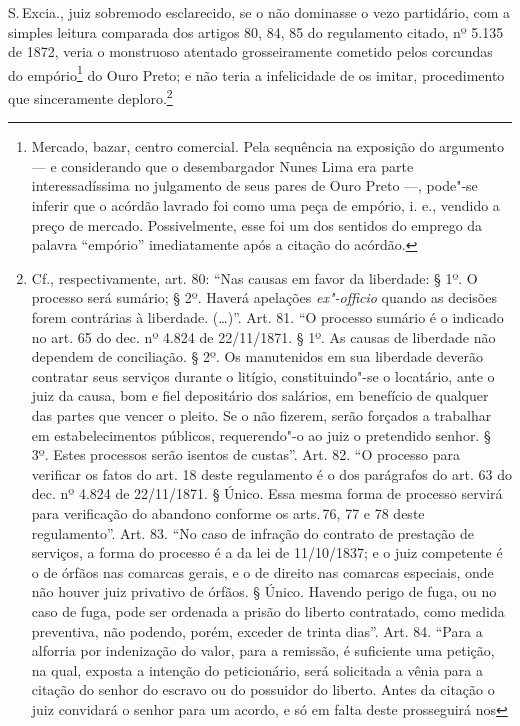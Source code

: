 S.\,Excia., juiz sobremodo esclarecido, se o não dominasse o vezo
partidário, com a simples leitura comparada dos artigos 80, 84, 85 do
regulamento citado, nº 5.135 de 1872, veria o monstruoso atentado
grosseiramente cometido pelos corcundas do empório\footnote{Mercado,
  bazar, centro comercial. Pela sequência na exposição do argumento --- e
  considerando que o desembargador Nunes Lima era parte interessadíssima no
  julgamento de seus pares de Ouro Preto ---, pode"-se inferir que o
  acórdão lavrado foi como uma peça de empório, i. e., vendido a preço
  de mercado. Possivelmente, esse foi um dos sentidos do emprego da
  palavra ``empório'' imediatamente após a citação do acórdão.} do Ouro
Preto; e não teria a infelicidade de os imitar, procedimento que
sinceramente deploro.\footnote{Cf., respectivamente, art. 80: ``Nas
  causas em favor da liberdade: § 1º. O processo será sumário; § 2º.
  Haverá apelações \emph{ex"-officio} quando as decisões forem contrárias
  à liberdade. (\ldots{})''. Art. 81. ``O processo sumário é o indicado no art.
  65 do dec. nº 4.824 de 22/11/1871. § 1º. As causas de liberdade não
  dependem de conciliação. § 2º. Os manutenidos em sua liberdade deverão
  contratar seus serviços durante o litígio, constituindo"-se o
  locatário, ante o juiz da causa, bom e fiel depositário dos salários,
  em benefício de qualquer das partes que vencer o pleito. Se o não
  fizerem, serão forçados a trabalhar em estabelecimentos públicos,
  requerendo"-o ao juiz o pretendido senhor. § 3º. Estes processos serão
  isentos de custas''. Art. 82. ``O processo para verificar os fatos do art.
  18 deste regulamento é o dos parágrafos do art. 63 do dec. nº 4.824 de
  22/11/1871. § Único. Essa mesma forma de processo servirá para
  verificação do abandono conforme os arts.\,76, 77 e 78 deste
  regulamento''. Art. 83. ``No caso de infração do contrato de prestação de
  serviços, a forma do processo é a da lei de 11/10/1837; e o juiz
  competente é o de órfãos nas comarcas gerais, e o de direito nas
  comarcas especiais, onde não houver juiz privativo de órfãos. § Único.
  Havendo perigo de fuga, ou no caso de fuga, pode ser ordenada a prisão
  do liberto contratado, como medida preventiva, não podendo, porém,
  exceder de trinta dias''. Art. 84. ``Para a alforria por indenização do
  valor, para a remissão, é suficiente uma petição, na qual, exposta a
  intenção do peticionário, será solicitada a vênia para a citação do
  senhor do escravo ou do possuidor do liberto. Antes da citação o juiz
  convidará o senhor para um acordo, e só em falta deste prosseguirá nos
}
